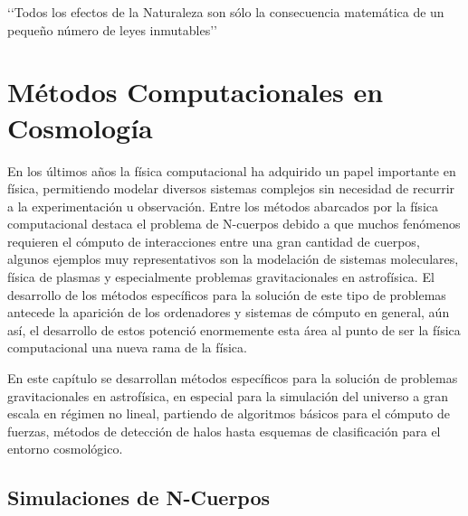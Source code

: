 \begin{savequote}[50mm]
‘‘Todos los efectos de la Naturaleza son sólo la consecuencia matemática 
de un pequeño número de leyes inmutables’’
\end{savequote}




\chapter{Métodos Computacionales en Cosmología}
\label{cha:N-BodySimulations}


En los últimos años la física computacional ha adquirido un papel 
importante en física, permitiendo modelar diversos sistemas complejos sin
necesidad de recurrir a la experimentación u observación. Entre los métodos
abarcados por la física computacional destaca el problema de N-cuerpos 
debido a que muchos fenómenos requieren el cómputo de interacciones entre 
una gran cantidad de cuerpos, algunos ejemplos muy representativos son la 
modelación de sistemas moleculares, física de plasmas y especialmente 
problemas gravitacionales en astrofísica. El desarrollo de los métodos 
específicos para la solución de este tipo de problemas antecede la 
aparición de los ordenadores y sistemas de cómputo en general, aún así, el
desarrollo de estos potenció enormemente esta área al punto de ser la 
física computacional una nueva rama de la física.


En este capítulo se desarrollan métodos específicos para la solución de 
proble\-mas gravitacionales en astrofísica, en especial para la simulación
del universo a gran escala en régimen no lineal, partiendo de algoritmos 
básicos para el cómputo de fuerzas, métodos de detección de 
halos hasta esquemas de clasificación para el entorno cosmológico.
 





\section{Simulaciones de N-Cuerpos}
\label{sec:N-bodySimulations}



